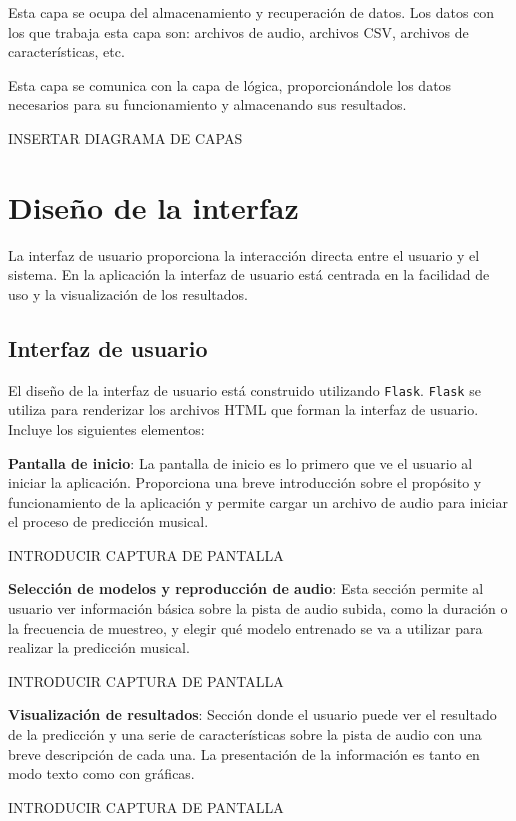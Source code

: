 Esta capa se ocupa del almacenamiento y recuperación de datos. Los datos con los que trabaja esta capa son: archivos de audio, archivos CSV, archivos de características, etc.

Esta capa se comunica con la capa de lógica, proporcionándole los datos necesarios para su funcionamiento y almacenando sus resultados.

INSERTAR DIAGRAMA DE CAPAS

\section{Diseño de la interfaz}

La interfaz de usuario proporciona la interacción directa entre el usuario y el sistema. En la aplicación la interfaz de usuario está centrada en la facilidad de uso y la visualización de los resultados.

\subsection{Interfaz de usuario}

El diseño de la interfaz de usuario está construido utilizando \texttt{Flask}. \texttt{Flask} se utiliza para renderizar los archivos HTML que forman la interfaz de usuario. Incluye los siguientes elementos:

\textbf{Pantalla de inicio}: La pantalla de inicio es lo primero que ve el usuario al iniciar la aplicación. Proporciona una breve introducción sobre el propósito y funcionamiento de la aplicación y permite cargar un archivo de audio para iniciar el proceso de predicción musical.

INTRODUCIR CAPTURA DE PANTALLA

\textbf{Selección de modelos y reproducción de audio}: Esta sección permite al usuario ver información básica sobre la pista de audio subida, como la duración o la frecuencia de muestreo, y elegir qué modelo entrenado se va a utilizar para realizar la predicción musical.

INTRODUCIR CAPTURA DE PANTALLA

\textbf{Visualización de resultados}: Sección donde el usuario puede ver el resultado de la predicción y una serie de características sobre la pista de audio con una breve descripción de cada una. La presentación de la información es tanto en modo texto como con gráficas.

INTRODUCIR CAPTURA DE PANTALLA
